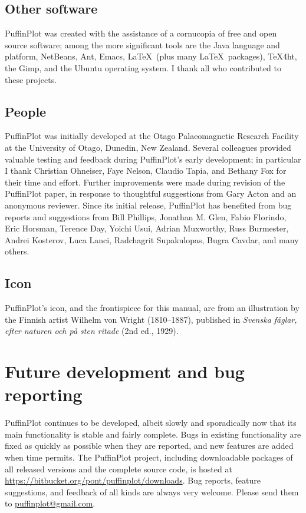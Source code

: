 \documentclass[a4paper,british]{article}
\begin{document}
\subsection*{Other software}

PuffinPlot was created with the assistance of a cornucopia of free and
open source software; among the more significant tools are the Java
language and platform, NetBeans, Ant, Emacs, \LaTeX\ (plus many
\LaTeX\ packages), TeX4ht, the Gimp, and the Ubuntu operating system. I
thank all who contributed to these projects.

\subsection*{People}

PuffinPlot was initially developed at the Otago Palaeomagnetic Research
Facility at the University of Otago, Dunedin, New Zealand. Several
colleagues provided valuable testing and feedback during PuffinPlot's
early development; in particular I thank Christian Ohneiser, Faye
Nelson, Claudio Tapia, and Bethany Fox for their time and effort.
Further improvements were made during revision of the PuffinPlot paper,
in response to thoughtful suggestions from Gary Acton and an anonymous
reviewer. Since its initial release, PuffinPlot has benefited from bug
reports and suggestions from Bill Phillips, Jonathan M. Glen, Fabio
Florindo, Eric Horsman, Terence Day, Yoichi Usui, Adrian Muxworthy,
Russ Burmester, Andrei Kosterov, Luca Lanci, Radchagrit Supakulopas,
Bugra Cavdar, and many others.

\subsection*{Icon}

PuffinPlot's icon, and the frontispiece for this manual, are from an
illustration by the Finnish artist Wilhelm von Wright (1810--1887), published
in \emph{Svenska f\aa glar, efter naturen och p\aa{} sten ritade} (2nd ed.,
1929).


\section{Future development and bug reporting}

PuffinPlot continues to be developed, albeit slowly and sporadically now
that its main functionality is stable and fairly complete. Bugs in
existing functionality are fixed as quickly as possible when they are
reported, and new features are added when time permits. The PuffinPlot
project, including downloadable packages of all released versions and
the complete source code, is hosted at
\url{https://bitbucket.org/pont/puffinplot/downloads}. Bug reports,
feature suggestions, and feedback of all kinds are always very welcome.
Please send them to
\textsf{\href{mailto:puffinplot@gmail.com}{puffinplot@gmail.com}}.
\end{document}
